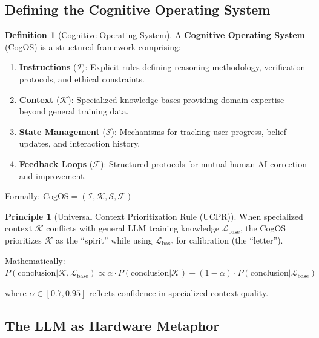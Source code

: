 \documentclass[11pt,a4paper]{article}
\theoremstyle{definition}
\newtheorem{definition}{Definition}[section]
\newtheorem{principle}{Principle}[section]
\theoremstyle{remark}
\begin{document}
\subsection{Defining the Cognitive Operating System}

\begin{definition}[Cognitive Operating System]
A \textbf{Cognitive Operating System} (CogOS) is a structured framework comprising:
\begin{enumerate}
    \item \textbf{Instructions} ($\mathcal{I}$): Explicit rules defining reasoning methodology, verification protocols, and ethical constraints.
    \item \textbf{Context} ($\mathcal{K}$): Specialized knowledge bases providing domain expertise beyond general training data.
    \item \textbf{State Management} ($\mathcal{S}$): Mechanisms for tracking user progress, belief updates, and interaction history.
    \item \textbf{Feedback Loops} ($\mathcal{F}$): Structured protocols for mutual human-AI correction and improvement.
\end{enumerate}
Formally: $\text{CogOS} = (\mathcal{I}, \mathcal{K}, \mathcal{S}, \mathcal{F})$
\end{definition}

\begin{principle}[Universal Context Prioritization Rule (UCPR)]
When specialized context $\mathcal{K}$ conflicts with general LLM training knowledge $\mathcal{L}_{\text{base}}$, the CogOS prioritizes $\mathcal{K}$ as the ``spirit'' while using $\mathcal{L}_{\text{base}}$ for calibration (the ``letter'').

Mathematically: $P(\text{conclusion}|\mathcal{K}, \mathcal{L}_{\text{base}}) \propto \alpha \cdot P(\text{conclusion}|\mathcal{K}) + (1-\alpha) \cdot P(\text{conclusion}|\mathcal{L}_{\text{base}})$

where $\alpha \in [0.7, 0.95]$ reflects confidence in specialized context quality.
\end{principle}

\subsection{The LLM as Hardware Metaphor}
\end{document}
